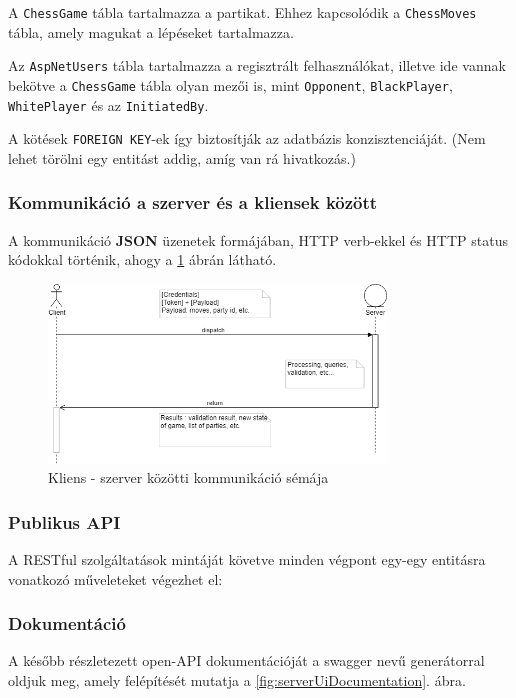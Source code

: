 \documentclass[twoside, a4paper, 12pt]{article}
\begin{document}
A \texttt{ChessGame} tábla tartalmazza a partikat. Ehhez kapcsolódik a \texttt{ChessMoves} tábla, amely magukat a lépéseket tartalmazza.

Az \texttt{AspNetUsers} tábla tartalmazza a regisztrált felhasználókat, illetve ide vannak bekötve a \texttt{ChessGame} tábla olyan mezői is, mint \texttt{Opponent}, \texttt{BlackPlayer}, \texttt{WhitePlayer} és az \texttt{InitiatedBy}.

A kötések \texttt{FOREIGN KEY}-ek így biztosítják az adatbázis konzisztenciáját. (Nem lehet törölni egy entitást addig, amíg van rá hivatkozás.)

\subsubsection{Kommunikáció a szerver és a kliensek között}
A kommunikáció \textbf{JSON} üzenetek formájában, HTTP verb-ekkel és HTTP status kódokkal történik, ahogy a \ref{fig:clientServerCommunication} ábrán látható.

\begin{figure}[htbp]
	\centering
	\includegraphics[width=0.8\textwidth]{img/clientServerCommunication.png}
	\caption{Kliens - szerver közötti kommunikáció sémája}
	\label{fig:clientServerCommunication}
\end{figure}

\subsubsection{Publikus API}
A RESTful szolgáltatások mintáját követve minden végpont egy-egy entitásra vonatkozó műveleteket végezhet el:














\subsubsection{Dokumentáció}
A később részletezett open-API dokumentációját a swagger nevű generátorral oldjuk meg, amely felépítését mutatja a \ref{fig:serverUiDocumentation}. ábra.
\end{document}
